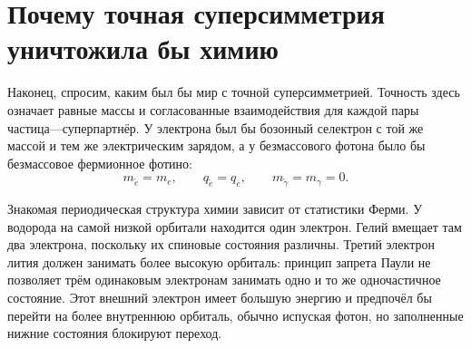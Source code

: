 \begin{classroomqa}
\end{classroomqa}

\begin{classroomqa}
\end{classroomqa}

\section{Почему точная суперсимметрия уничтожила бы химию}

Наконец, спросим, каким был бы мир с точной суперсимметрией. Точность здесь означает равные массы и согласованные взаимодействия для каждой пары частица—суперпартнёр. У электрона был бы бозонный селектрон с той же массой и тем же электрическим зарядом, а у безмассового фотона было бы безмассовое фермионное фотино:
\begin{equation}
m_{\widetilde e}=m_e,
\qquad
q_{\widetilde e}=q_e,
\qquad
m_{\widetilde\gamma}=m_\gamma=0.
\end{equation}

Знакомая периодическая структура химии зависит от статистики Ферми. У водорода на самой низкой орбитали находится один электрон. Гелий вмещает там два электрона, поскольку их спиновые состояния различны. Третий электрон лития должен занимать более высокую орбиталь: принцип запрета Паули не позволяет трём одинаковым электронам занимать одно и то же одночастичное состояние. Этот внешний электрон имеет большую энергию и предпочёл бы перейти на более внутреннюю орбиталь, обычно испуская фотон, но заполненные нижние состояния блокируют переход.


